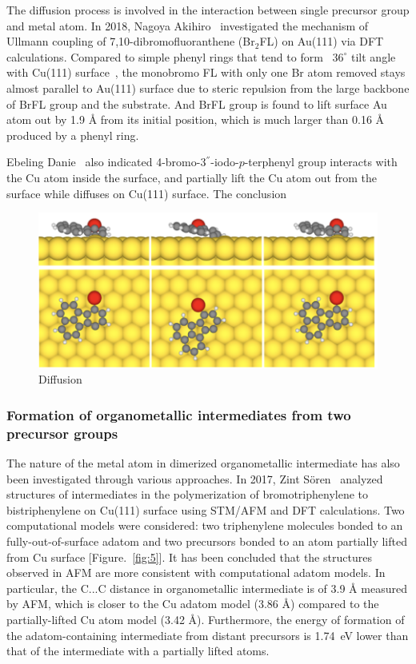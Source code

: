 \documentclass[aps,reprint,amsmath,amssymb]{revtex4-2}
\begin{document}
The diffusion process is involved in the interaction between single precursor group and metal atom. 
In 2018, Nagoya Akihiro~\cite{jpcc2018} investigated the mechanism of Ullmann coupling of 7,10-dibromofluoranthene (Br$_{2}$FL) on Au(111) via DFT calculations. Compared to simple phenyl rings that tend to form ~$36^\circ$ tilt angle with Cu(111) surface~\cite{pccp2010}, the monobromo FL with only one Br atom removed stays almost parallel to Au(111) surface due to steric repulsion from the large backbone of BrFL group and the substrate. And BrFL group is found to lift surface Au atom out by 1.9 \si{\angstrom} from its initial position, which is much larger than 0.16 \si{\angstrom} produced by a phenyl ring. 

Ebeling Danie~\cite{acsnano2019} also indicated 4-bromo-3$^{''}$-iodo-$p$-terphenyl group interacts with the Cu atom inside the surface, and partially lift the Cu atom out from the surface while diffuses on Cu(111) surface. The conclusion 

\begin{figure}[ht]
\centering
\includegraphics[width=0.98\columnwidth]{Fig/Diffusion_path.png}
\caption{Diffusion}
\label{fig:diff}
\end{figure}


\subsubsection{Formation of organometallic intermediates from two precursor groups}

The nature of the metal atom in dimerized organometallic intermediate has also been investigated through various approaches. In 2017, Zint Sören~\cite{acsnano2017} analyzed structures of intermediates in the polymerization of bromotriphenylene to bistriphenylene on Cu(111) surface using STM/AFM and DFT calculations. Two computational models were considered: two triphenylene molecules bonded to an fully-out-of-surface adatom and two precursors bonded to an atom partially lifted from Cu surface [Figure.~\ref{fig:5}]. It has been concluded that the structures observed in AFM are more consistent with computational adatom models. In particular, the C...C distance in organometallic intermediate is of 3.9 \si{\angstrom} measured by AFM, which is closer to the Cu adatom model (3.86 \si{\angstrom}) compared to the partially-lifted Cu atom model (3.42 \si{\angstrom}). Furthermore, the energy of formation of the adatom-containing intermediate from distant precursors is 1.74~eV lower than that of the intermediate with a partially lifted atoms. 
\end{document}
